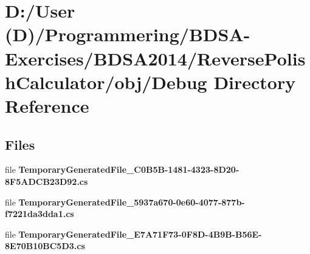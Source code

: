 \section{D\+:/\+User (D)/\+Programmering/\+B\+D\+S\+A-\/\+Exercises/\+B\+D\+S\+A2014/\+Reverse\+Polish\+Calculator/obj/\+Debug Directory Reference}
\label{dir_a71c3b2ad23b9ff58220dd012d201987}
\subsection*{Files}
\begin{DoxyCompactItemize}
\item 
file {\bf Temporary\+Generated\+File\+\_\+C0\+B5\+B-\/1481-\/4323-\/8\+D20-\/8\+F5\+A\+D\+C\+B23\+D92.\+cs}
\item 
file {\bf Temporary\+Generated\+File\+\_\+5937a670-\/0e60-\/4077-\/877b-\/f7221da3dda1.\+cs}
\item 
file {\bf Temporary\+Generated\+File\+\_\+\+E7\+A71\+F73-\/0\+F8\+D-\/4\+B9\+B-\/\+B56\+E-\/8\+E70\+B10\+B\+C5\+D3.\+cs}
\end{DoxyCompactItemize}
